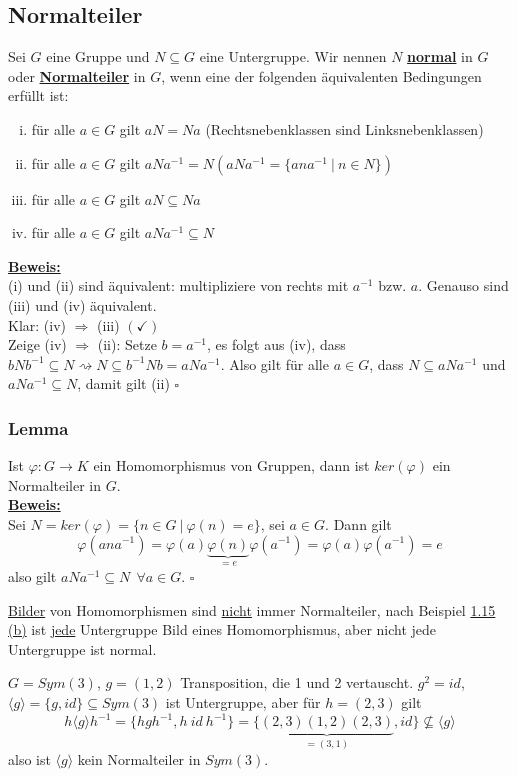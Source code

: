 \documentclass[a4paper, pagesize=pdftex, pdftex, twoside, headsepline, index=totoc,toc=listof, fontsize=10pt, cleardoublepage=empty, headinclude, DIV=13, BCOR=13mm]{scrartcl}
\newcommand{\bet}[1]{\uline{\textbf{#1}}} %
\newcommand{\Index}[1]{\uline{\textbf{#1}}\index{#1}} %
\newcommand{\lh}[1]{\langle #1 \rangle} %
\begin{document}
\subsection{Normalteiler}
\label{sub:normalteiler}
Sei $G$ eine Gruppe und $N\subseteq G$ eine Untergruppe. Wir nennen $N$ \Index{normal} in $G$ oder \Index{Normalteiler} in $G$, wenn eine der folgenden äquivalenten Bedingungen erfüllt ist:
\begin{enumerate}[(i)]
	\item für alle $a\in G$ gilt $aN=Na$ (Rechtsnebenklassen sind Linksnebenklassen)
	\item für alle $a\in G$ gilt $aNa^{-1}=N (aNa^{-1}=\{ana^{-1}~|~n\in N \})$
	\item für alle $a\in G$ gilt $aN\subseteq Na$
	\item für alle $a\in G$ gilt $aNa^{-1}\subseteq N$
\end{enumerate}

\bet{Beweis:}\\
(i) und (ii) sind äquivalent: multipliziere von rechts mit $a^{-1}$ bzw. $a$. Genauso sind (iii) und (iv) äquivalent.\\
Klar: (iv) $\Rightarrow$ (iii) $(\checkmark)$\\
Zeige (iv) $\Rightarrow$ (ii): Setze $b=a^{-1}$, es folgt aus (iv), dass $bNb^{-1}\subseteq N \rightsquigarrow N\subseteq b^{-1}Nb=aNa^{-1}$. Also gilt für alle $a\in G$, dass $N\subseteq aNa^{-1}$ und $aNa^{-1}\subseteq N$, damit gilt (ii)
\hfill $\square$

\subsubsection*{Lemma}
Ist $\varphi: G \to K$ ein Homomorphismus von Gruppen, dann ist $ker(\varphi)$ ein Normalteiler in $G$.\\
\bet{Beweis:}\\
Sei $N=ker(\varphi)=\{n\in G~|~\varphi(n)=e\}$, sei $a\in G$. Dann gilt 
\[
\varphi(ana^{-1})=\varphi(a)\underbrace{\varphi(n)}_{=e}\varphi(a^{-1})=\varphi(a)\varphi(a^{-1})=e
\]
also gilt $aNa^{-1}\subseteq N~~\forall a\in G$.
\hfill $\square$

\uline{Bilder} von Homomorphismen sind \uline{nicht} immer Normalteiler, nach Beispiel \hyperref[sub:homomorphismen]{1.15 (b)} ist \uline{jede} Untergruppe Bild eines Homomorphismus, aber nicht jede Untergruppe ist normal.

$G=Sym(3)$, $g=(1,2)$ Transposition, die 1 und 2 vertauscht. $g^2=id$, $\lh{g}=\{g,id\}\subseteq Sym(3)$ ist Untergruppe, aber für $h=(2,3)$ gilt 
\[
h\lh{g}h^{-1}=\{hgh^{-1}, h~id~h^{-1} \} = \{\underbrace{(2,3)(1,2)(2,3)}_{=(3,1)}, id \} \not\subseteq \lh{g}
\]
also ist $\lh{g}$ kein Normalteiler in $Sym(3)$.\\
\end{document}
